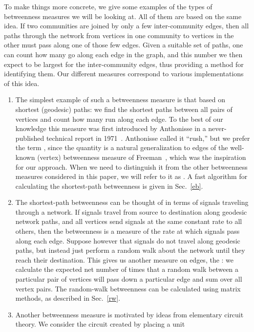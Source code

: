\documentclass[twocolumn,pre,superscriptaddress]{revtex4}
\begin{document}
To make things more concrete, we give some examples of the types of
betweenness measures we will be looking at.  All of them are based on the
same idea.  If two communities are joined by only a few inter-community
edges, then all paths through the network from vertices in one community to
vertices in the other must pass along one of those few edges.  Given a
suitable set of paths, one can count how many go along each edge in the
graph, and this number we then expect to be largest for the inter-community
edges, thus providing a method for identifying them.  Our different
measures correspond to various implementations of this idea.
\begin{enumerate}
\item The simplest example of such a betweenness measure is that based on
shortest (geodesic) paths: we find the shortest paths between all pairs of
vertices and count how many run along each edge.  To the best of our
knowledge this measure was first introduced by Anthonisse in a
never-published technical report in 1971~\cite{Anthonisse71}.  Anthonisse
called it ``rush,'' but we prefer the term , since
the quantity is a natural generalization to edges of the well-known
(vertex) betweenness measure of Freeman~\cite{Freeman77}, which was the
inspiration for our approach.  When we need to distinguish it from the
other betweenness measures considered in this paper, we will refer to it as
.  A fast algorithm for calculating the
shortest-path betweenness is given in Sec.~\ref{eb}.
\item The shortest-path betweenness can be thought of in terms of signals
traveling through a network.  If signals travel from source to destination
along geodesic network paths, and all vertices send signals at the same
constant rate to all others, then the betweenness is a measure of the rate
at which signals pass along each edge.  Suppose however that signals do not
travel along geodesic paths, but instead just perform a random walk about
the network until they reach their destination.  This gives us another
measure on edges, the : we calculate the
expected net number of times that a random walk between a particular pair
of vertices will pass down a particular edge and sum over all vertex pairs.
The random-walk betweenness can be calculated using matrix methods, as
described in Sec.~\ref{rw}.
\item Another betweenness measure is motivated by ideas from elementary
circuit theory.  We consider the circuit created by placing a unit

\end{enumerate}
\end{document}
